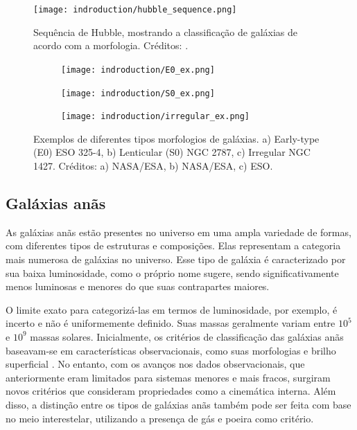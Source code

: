 \begin{figure}[!ht]
    \begin{center}
    \texttt{[image: indroduction/hubble\_sequence.png]}
    \caption[]{Sequência de Hubble, mostrando a classificação de galáxias de acordo com a morfologia. Créditos: \cite{huble_sequence_img}.}
    \label{hubble_sequence}
    \end{center}
\end{figure}


\begin{figure}[!ht]
    \centering
    \captionsetup{justification=centering}
    \begin{subfigure}[b]{0.237\textwidth}
        \texttt{[image: indroduction/E0\_ex.png]}
        \caption{}
    \end{subfigure}
    \begin{subfigure}[b]{0.26\textwidth}
        \texttt{[image: indroduction/S0\_ex.png]}
        \caption{}
    \end{subfigure}
    \begin{subfigure}[b]{0.268\textwidth}
        \texttt{[image: indroduction/irregular\_ex.png]}
        \caption{}
    \end{subfigure}
    \caption{Exemplos de diferentes tipos morfologios de galáxias. a) Early-type (E0) ESO 325-4, b) Lenticular (S0) NGC 2787, c) Irregular NGC 1427. Créditos: a) NASA/ESA, b) NASA/ESA, c) ESO.}
    \label{galaxies_morphology}
\end{figure}

\subsection{Galáxias anãs}\label{subsec:dwarf_galaxies}
As galáxias anãs estão presentes no universo em uma ampla variedade de formas, com diferentes tipos de estruturas e composições. Elas representam a categoria mais numerosa de galáxias no universo. Esse tipo de galáxia é caracterizado por sua baixa luminosidade, como o próprio nome sugere, sendo significativamente menos luminosas e menores do que suas contrapartes maiores.

O limite exato para categorizá-las em termos de luminosidade, por exemplo, é incerto e não é uniformemente definido. Suas massas geralmente variam entre $10^5$ e $10^9$ massas solares. Inicialmente, os critérios de classificação das galáxias anãs baseavam-se em características observacionais, como suas morfologias e brilho superficial \citep{dwarf_classification_init}. No entanto, com os avanços nos dados observacionais, que anteriormente eram limitados para sistemas menores e mais fracos, surgiram novos critérios que consideram propriedades como a cinemática interna. Além disso, a distinção entre os tipos de galáxias anãs também pode ser feita com base no meio interestelar, utilizando a presença de gás e poeira como critério.

